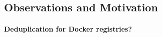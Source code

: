 \subsection{Observations and Motivation} %
\label{sec:observationandmotivation}


%
%
%
%

\paragraph{Deduplication for Docker registries?}



